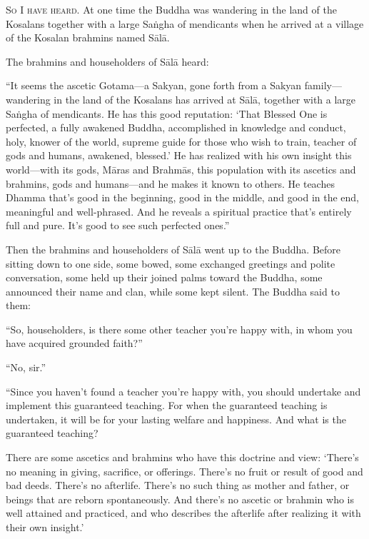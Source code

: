 \documentclass[12pt,openany]{book}%
\newcommand*{\scevam}[1]{\textsc{#1}}
\begin{document}
\scevam{So I have heard. }At one time the Buddha was wandering in the land of the Kosalans together with a large \textsanskrit{Saṅgha} of mendicants when he arrived at a village of the Kosalan brahmins named \textsanskrit{Sālā}. 

The brahmins and householders of \textsanskrit{Sālā} heard: 

“It seems the ascetic Gotama—a Sakyan, gone forth from a Sakyan family—wandering in the land of the Kosalans has arrived at \textsanskrit{Sālā}, together with a large \textsanskrit{Saṅgha} of mendicants. He has this good reputation: ‘That Blessed One is perfected, a fully awakened Buddha, accomplished in knowledge and conduct, holy, knower of the world, supreme guide for those who wish to train, teacher of gods and humans, awakened, blessed.’ He has realized with his own insight this world—with its gods, \textsanskrit{Māras} and \textsanskrit{Brahmās}, this population with its ascetics and brahmins, gods and humans—and he makes it known to others. He teaches Dhamma that’s good in the beginning, good in the middle, and good in the end, meaningful and well-phrased. And he reveals a spiritual practice that’s entirely full and pure. It’s good to see such perfected ones.” 

Then the brahmins and householders of \textsanskrit{Sālā} went up to the Buddha. Before sitting down to one side, some bowed, some exchanged greetings and polite conversation, some held up their joined palms toward the Buddha, some announced their name and clan, while some kept silent. The Buddha said to them: 

“So, householders, is there some other teacher you’re happy with, in whom you have acquired grounded faith?” 

“No, sir.” 

“Since you haven’t found a teacher you’re happy with, you should undertake and implement this guaranteed teaching. For when the guaranteed teaching is undertaken, it will be for your lasting welfare and happiness. And what is the guaranteed teaching? 

There are some ascetics and brahmins who have this doctrine and view: ‘There’s no meaning in giving, sacrifice, or offerings. There’s no fruit or result of good and bad deeds. There’s no afterlife. There’s no such thing as mother and father, or beings that are reborn spontaneously. And there’s no ascetic or brahmin who is well attained and practiced, and who describes the afterlife after realizing it with their own insight.’ 
\end{document}
